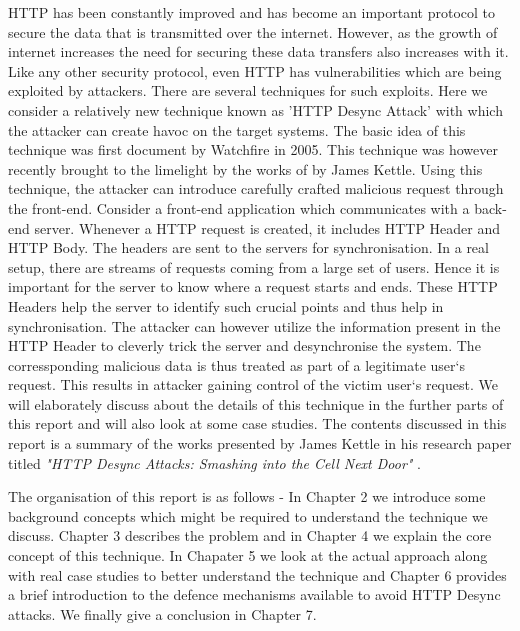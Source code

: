 HTTP has been constantly improved and has become an important protocol to secure the data that is transmitted over the internet. However, as the growth of internet increases the need for securing these data transfers also increases with it. Like any other security protocol, even HTTP has vulnerabilities which are being exploited by attackers. There are several techniques for such exploits. Here we consider a relatively new technique known as 'HTTP Desync Attack' with which the attacker can create havoc on the target systems. The basic idea of this technique was first document by Watchfire in 2005\cite{b5}. This technique was however recently brought to the limelight by the works of by James Kettle\cite{b6}. Using this technique, the attacker can introduce carefully crafted malicious request through the front-end. Consider a front-end application which communicates with a back-end server.  Whenever a HTTP request is created, it includes HTTP Header and HTTP Body. The headers are sent to the servers for synchronisation. In a real setup, there are streams of requests coming from a large set of users. Hence it is important for the server to know where a request starts and ends. These HTTP Headers help the server to identify such crucial points and thus help in synchronisation. The attacker can however utilize the information present in the HTTP Header to cleverly trick the server and desynchronise the system. The corressponding malicious data is thus treated as part of a legitimate user`s request. This results in attacker gaining control of the victim user`s request. We will elaborately discuss about the details of this technique in the further parts of this report and will also look at some case studies. The contents discussed in this report is a summary of the works presented by James Kettle in his research paper titled \textit{"HTTP Desync Attacks: Smashing into the Cell Next Door"} \cite{b6}.

The organisation of this report is as follows - In Chapter 2 we introduce some background concepts which might be required to understand the technique we discuss. Chapter 3 describes the problem and in Chapter 4 we explain the core concept of this technique. In Chapater 5 we look at the actual approach along with real case studies to better understand the technique and Chapter 6 provides a brief introduction to the defence mechanisms available to avoid HTTP Desync attacks. We finally give a conclusion in Chapter 7. 


